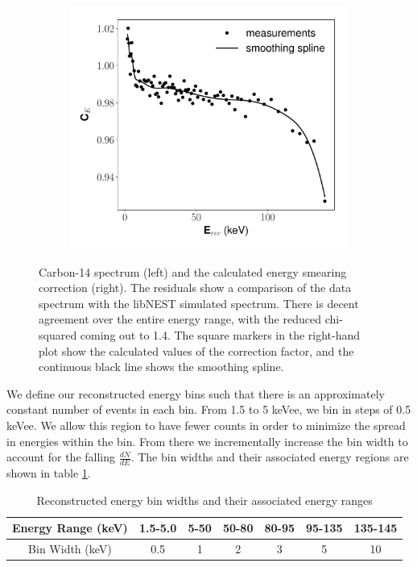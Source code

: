 \begin{figure}[h!]
\begin{subfigure}{0.5\textwidth}
  \includegraphics[width=\textwidth]{Figures/yields_corrections/C14_E_correction_gfdcm_180Vcm_prelim.pdf}
  \caption{}
  \label{fig:c14ecorr_180_prelim}
\end{subfigure}
\caption{Carbon-14 spectrum (left) and the calculated energy smearing correction (right). The residuals show a comparison of the data spectrum with the libNEST simulated spectrum. There is decent agreement over the entire energy range, with the reduced chi-squared coming out to 1.4. The square markers in the right-hand plot show the calculated values of the correction factor, and the continuous black line shows the smoothing spline.}
\label{fig:c14_ecorr}
\end{figure} 
We define our reconstructed energy bins such that there is an approximately constant number of events in each bin. From 1.5 to 5 keVee, we bin in steps of 0.5 keVee. We allow this region to have fewer counts in order to minimize the spread in energies within the bin. From there we incrementally increase the bin width to account for the falling $\frac{dN}{dE}$. The bin widths and their associated energy regions  are shown in table \ref{tab:ebins}.
\begin{table}[h!]
\centering
    \begin{tabular}{ c || c | c | c | c | c | c  }
    \hline
    Energy Range (keV) & 1.5-5.0 & 5-50  & 50-80 & 80-95 & 95-135 & 135-145\\
    \hline
    Bin Width (keV)         &  0.5       & 1      & 2        & 3         & 5           & 10 \\
    \hline
    \end{tabular}
    \caption{Reconstructed energy bin widths and their associated energy ranges}
    \label{tab:ebins}
\end{table}

